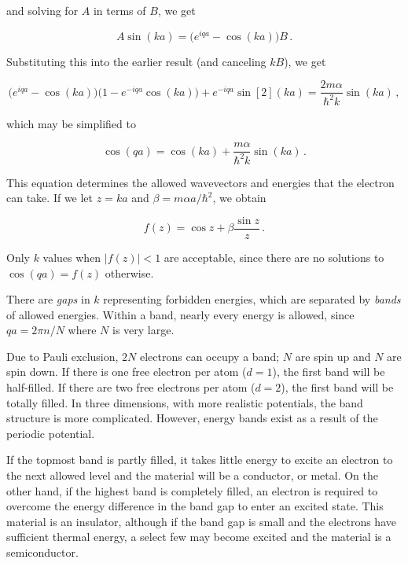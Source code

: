 \documentclass[12pt, titlepage]{article}
\begin{document}
and solving for $A$ in terms of $B$, we get

\begin{equation*}
	A\sin(ka) = \biggl(e^{iqa}-\cos(ka)\biggr)B \,.
\end{equation*}

Substituting this into the earlier result (and canceling $kB$), we get

\begin{equation*}
	\biggl(e^{iqa} - \cos(ka)\biggr)\bigg(1-e^{-iqa}\cos(ka)\bigg) + e^{-iqa}\sin[2](ka) = \frac{2m\alpha}{\hbar^2k}\sin(ka) \,,
\end{equation*}

which may be simplified to

\begin{equation}
	\cos(qa) = \cos(ka) + \frac{m\alpha}{\hbar^2k}\sin(ka) \,.
\end{equation}

This equation determines the allowed wavevectors and energies that the electron can take. If we let $z=ka$ and $\beta=m\alpha a/\hbar^2$, we obtain

\begin{equation*}
	f(z) = \cos z + \beta\frac{\sin z}{z} \,.
\end{equation*}

Only $k$ values when $|f(z)|<1$ are acceptable, since there are no solutions to $\cos(qa) = f(z)$ otherwise.



There are \textit{gaps} in $k$ representing forbidden energies, which are separated by \textit{bands} of allowed energies. Within a band, nearly every energy is allowed, since $qa = 2\pi n/N$ where $N$ is very large. 

Due to Pauli exclusion, $2N$ electrons can occupy a band; $N$ are spin up and $N$ are spin down. If there is one free electron per atom ($d=1$), the first band will be half-filled. If there are two free electrons per atom ($d=2$), the first band will be totally filled. In three dimensions, with more realistic potentials, the band structure is more complicated. However, energy bands exist as a result of the periodic potential.

If the topmost band is partly filled, it takes little energy to excite an electron to the next allowed level and the material will be a conductor, or metal. On the other hand, if the highest band is completely filled, an electron is required to overcome the energy difference in the band gap to enter an excited state. This material is an insulator, although if the band gap is small and the electrons have sufficient thermal energy, a select few may become excited and the material is a semiconductor.
\end{document}
